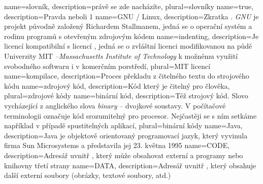 {
  name={slovník},
  description={právě se zde nacházíte},
  plural={slovníky}
}
{
  name={true},
  description={Pravda neboli 1}
}
{
  name={GNU / Linux},
  description={Zkratka . {\em GNU} je projekt původně založený Richardem Stallmanem, jedná se o operační systém a rodinu programů s otevřeným zdrojovým kódem}
}
{
  name={indenting},
  description={Je licencí kompatibilní s licencí , jedná se o zvláštní licenci modifikovanou na půdě Univerzity MIT {\em --Massachusetts Institute of Technology} k možnému využití svobodného softwaru i v komerčním porstředí},
  plural={MIT licencí}
}
{
	name={kompilace},
	description={Proces překladu z čitelného textu do strojového kódu}
}
{
	name={zdrojový kód},
	description={Kód který je čitelný pro člověka},
	plural={zdrojové kódy}
}
{
	name={binární kód},
	description={Též strojový kód. Slovo vycházející z anglického slova {\em binary} -- dvojkové soustavy. V počítačové terminologii označuje kód srozumitelný pro procesor. Nejčastěji se s ním setkáme například v případě spustitelných aplikací},
	plural={binární kódy}
}
{
	name={Java},
	description={Java je objektově orientovaný programovací jazyk, který vyvinula firma Sun Microsystems a představila jej 23. května 1995}
}
{
	name={CODE},
	description={Adresář uvnitř , který může obsahovat externí  a  programy nebo knihovny třetí strany}
}
{
	name={DATA},
	description={Adresář uvnitř , který obsahuje další externí soubory (obrázky, textové soubory, atd.)}
}

